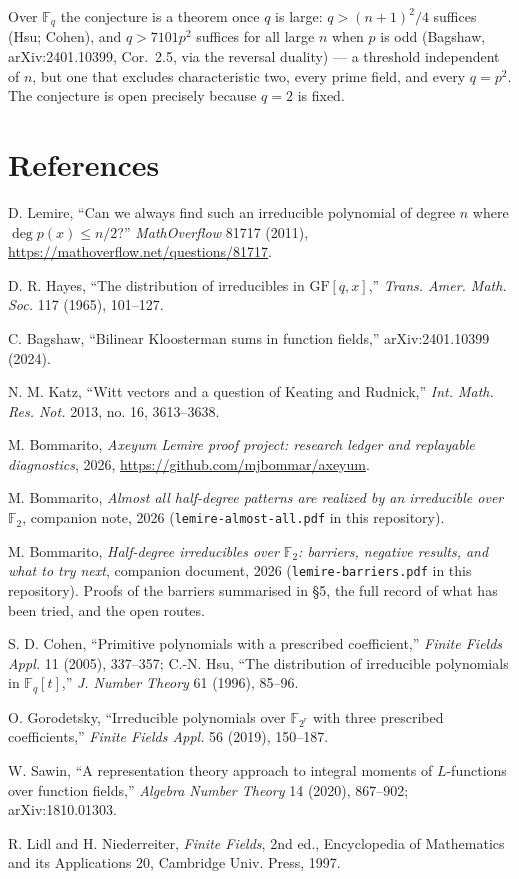 \documentclass[10pt]{article}
\newcommand{\F}{\mathbb F}
\begin{document}
Over $\F_q$ the conjecture is a theorem once $q$ is large: $q>(n+1)^2/4$
suffices (Hsu; Cohen), and $q>7101p^2$ suffices for all large $n$ when $p$ is
odd (Bagshaw, arXiv:2401.10399, Cor.~2.5, via the reversal duality) --- a
threshold independent of $n$, but one that excludes characteristic two, every
prime field, and every $q=p^2$. The conjecture is open precisely because
$q=2$ is fixed.

\section*{References}
\small
\begin{enumerate}[label={[\arabic*]},leftmargin=1.6em]
\item D. Lemire, ``Can we always find such an irreducible polynomial of
degree $n$ where $\deg p(x)\leq n/2$?'' \emph{MathOverflow} 81717 (2011),
\url{https://mathoverflow.net/questions/81717}.
\item D. R. Hayes, ``The distribution of irreducibles in $\mathrm{GF}[q,x]$,''
\emph{Trans. Amer. Math. Soc.} 117 (1965), 101--127.
\item C. Bagshaw, ``Bilinear Kloosterman sums in function fields,''
arXiv:2401.10399 (2024).
\item N. M. Katz, ``Witt vectors and a question of Keating and Rudnick,''
\emph{Int. Math. Res. Not.} 2013, no. 16, 3613--3638.
\item M. Bommarito, \emph{Axeyum Lemire proof project: research ledger and
replayable diagnostics}, 2026, \url{https://github.com/mjbommar/axeyum}.
\item M. Bommarito, \emph{Almost all half-degree patterns are realized by an
irreducible over $\F_2$}, companion note, 2026 (\texttt{lemire-almost-all.pdf}
in this repository).
\item M. Bommarito, \emph{Half-degree irreducibles over $\F_2$: barriers,
negative results, and what to try next}, companion document, 2026
(\texttt{lemire-barriers.pdf} in this repository). Proofs of the barriers
summarised in \S5, the full record of what has been tried, and the open
routes.
\item S. D. Cohen, ``Primitive polynomials with a prescribed coefficient,''
\emph{Finite Fields Appl.} 11 (2005), 337--357; C.-N. Hsu, ``The distribution
of irreducible polynomials in $\F_q[t]$,'' \emph{J. Number Theory} 61 (1996),
85--96.
\item O. Gorodetsky, ``Irreducible polynomials over $\F_{2^r}$ with three
prescribed coefficients,'' \emph{Finite Fields Appl.} 56 (2019), 150--187.
\item W. Sawin, ``A representation theory approach to integral moments of
$L$-functions over function fields,'' \emph{Algebra Number Theory} 14 (2020),
867--902; arXiv:1810.01303.
\item R. Lidl and H. Niederreiter, \emph{Finite Fields}, 2nd ed., Encyclopedia
of Mathematics and its Applications 20, Cambridge Univ. Press, 1997.
\end{enumerate}
\end{document}
